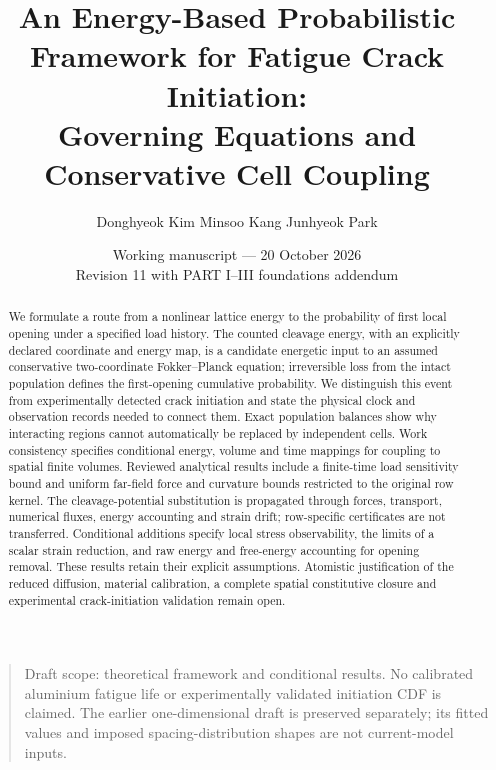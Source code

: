 \documentclass[11pt]{article}
\title{An Energy-Based Probabilistic Framework for Fatigue Crack Initiation:\\
Governing Equations and Conservative Cell Coupling}
\author{Donghyeok Kim \quad Minsoo Kang \quad Junhyeok Park}
\date{Working manuscript --- 20 October 2026\\Revision 11 with PART I--III foundations addendum}
\begin{document}
\maketitle
\begin{abstract}
We formulate a route from a nonlinear lattice energy to the probability of
first local opening under a specified load history. The counted cleavage energy, with an explicitly declared coordinate and energy map,
is a candidate energetic input to an assumed conservative two-coordinate
Fokker--Planck equation; irreversible loss from
the intact population defines the first-opening cumulative probability.
We distinguish this event from experimentally detected crack initiation and
state the physical clock and observation records needed to connect them.
Exact population balances show why interacting regions cannot automatically
be replaced by independent cells. Work consistency specifies conditional
energy, volume and time mappings for coupling to spatial finite volumes.
Reviewed analytical results include a finite-time load sensitivity bound
and uniform far-field force and curvature bounds restricted to the original row kernel.
The cleavage-potential substitution is propagated through forces, transport, numerical
fluxes, energy accounting and strain drift; row-specific certificates are not transferred.
Conditional additions specify local stress observability, the limits of a scalar strain reduction,
and raw energy and free-energy accounting for opening removal.
These results retain their explicit assumptions. Atomistic justification of
the reduced diffusion, material calibration, a complete spatial constitutive
closure and experimental crack-initiation validation remain open.
\end{abstract}
\begin{quote}\small
Draft scope: theoretical framework and conditional results. No calibrated
aluminium fatigue life or experimentally validated initiation CDF is claimed.
The earlier one-dimensional draft is preserved separately; its fitted values
and imposed spacing-distribution shapes are not current-model inputs.
\end{quote}


\end{document}
